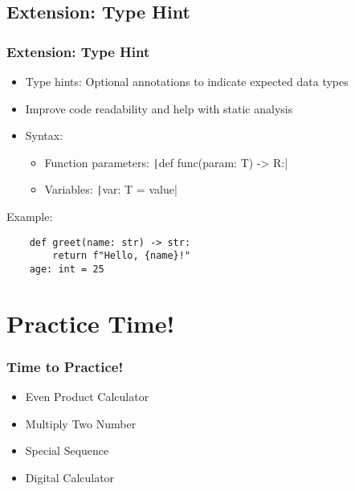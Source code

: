 \documentclass{beamer}
\newcommand{\python}[1]{\texttt|#1|}
\begin{document}
\subsection{Extension: Type Hint}
\begin{frame}[fragile]
    \frametitle{Extension: Type Hint}
    \begin{itemize}
        \item Type hints: Optional annotations to indicate expected data types
        \item Improve code readability and help with static analysis
        \item Syntax:
              \begin{itemize}
                  \item Function parameters: \python{def func(param: T) -> R:}
                  \item Variables: \python{var: T = value}
              \end{itemize}
    \end{itemize}
    Example:
    \begin{verbatim}
    def greet(name: str) -> str:
        return f"Hello, {name}!"
    age: int = 25
    \end{verbatim}
\end{frame}

\section{Practice Time!}
\begin{frame}
    \frametitle{Time to Practice!}
    \begin{itemize}
        \item Even Product Calculator
        \item Multiply Two Number
        \item Special Sequence
        \item Digital Calculator
    \end{itemize}
\end{frame}
\end{document}
